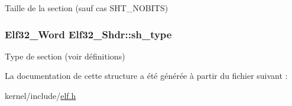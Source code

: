 Taille de la section (sauf cas S\-H\-T\-\_\-\-N\-O\-B\-I\-T\-S) \hypertarget{structElf32__Shdr_aab6c221dbd7e16987df41280fb915408}{
\subsubsection[{sh\-\_\-type}]{\setlength{\rightskip}{0pt plus 5cm}Elf32\-\_\-\-Word Elf32\-\_\-\-Shdr\-::sh\-\_\-type}}\label{structElf32__Shdr_aab6c221dbd7e16987df41280fb915408}
Type de section (voir définitions) 

La documentation de cette structure a été générée à partir du fichier suivant \-:\begin{DoxyCompactItemize}
\item 
kernel/include/\hyperlink{elf_8h}{elf.\-h}\end{DoxyCompactItemize}
